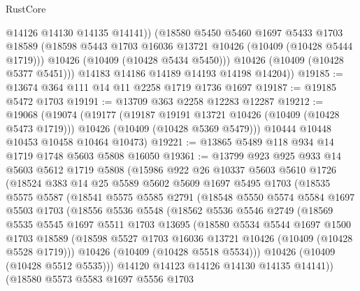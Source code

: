 \begin{lexlean}{RustCore}
\begin{coremodule}
              @14126
              @14130
              @14135
              @14141))
          (@18580
            @5450
            @5460
            @1697
            @5433
            @1703
            @18589
            (@18598 @5443 @1703 @16036 @13721 @10426 (@10409 (@10428 @5444 @1719)))
            @10426
            (@10409 (@10428 @5434 @5450)))
          @10426
          (@10409 (@10428 @5377 @5451)))
        @14183
        @14186
        @14189
        @14193
        @14198
        @14204))
@19185 := @13674 @364 @111 @14 @11 @2258 @1719 @1736 @1697
@19187 := @19185 @5472 @1703
@19191 := @13709 @363 @2258 @12283 @12287
@19212 := @19068
    (@19074
      (@19177
        (@19187 @19191 @13721 @10426 (@10409 (@10428 @5473 @1719)))
        @10426
        (@10409 (@10428 @5369 @5479)))
      @10444
      @10448
      @10453
      @10458
      @10464
      @10473)
@19221 := @13865 @5489 @118 @934 @14 @1719 @1748 @5603 @5808 @16050
@19361 := @13799
    @923
    @925
    @933
    @14
    @5603
    @5612
    @1719
    @5808
    (@15986
      @922
      @26
      @10337
      @5603
      @5610
      @1726
      (@18524
        @383
        @14
        @25
        @5589
        @5602
        @5609
        @1697
        @5495
        @1703
        (@18535
          @5575
          @5587
          (@18541
            @5575
            @5585
            @2791
            (@18548
              @5550
              @5574
              @5584
              @1697
              @5503
              @1703
              (@18556
                @5536
                @5548
                (@18562
                  @5536
                  @5546
                  @2749
                  (@18569
                    @5535
                    @5545
                    @1697
                    @5511
                    @1703
                    @13695
                    (@18580
                      @5534
                      @5544
                      @1697
                      @1500
                      @1703
                      @18589
                      (@18598 @5527 @1703 @16036 @13721 @10426 (@10409 (@10428 @5528 @1719)))
                      @10426
                      (@10409 (@10428 @5518 @5534)))
                    @10426
                    (@10409 (@10428 @5512 @5535)))
                  @14120
                  @14123
                  @14126
                  @14130
                  @14135
                  @14141))
              (@18580
                @5573
                @5583
                @1697
                @5556
                @1703

\end{coremodule}
\end{lexlean}
